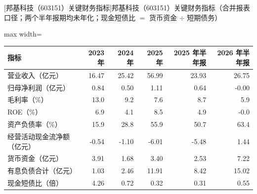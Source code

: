 \begin{center}\small\setlength{\tabcolsep}{3.4pt}
[邦基科技（603151）关键财务指标]{邦基科技（603151）关键财务指标（合并报表口径；两个半年报期均未年化；现金短债比 $=$ 货币资金 $\div$ 短期债务）}
\begin{adjustbox}{max width=\textwidth}
\begin{tabular}{@{}lrrrrr@{}}
\toprule
指标 & 2023 年 & 2024 年 & 2025 年 & 2025 年半年报 & 2026 年半年报 \\
\midrule
营业收入（亿元） & 16.47 & 25.42 & 56.99 & 23.93 & 26.75 \\
归母净利润（亿元） & 0.84 & 0.50 & 1.11 & 0.64 & -0.00 \\
毛利率（\%） & 13.0 & 9.2 & 7.6 & 8.7 & 5.9 \\
ROE（\%） & 6.9 & 4.1 & 8.5 & 4.9 & -0.0 \\
资产负债率（\%） & 15.9 & 28.8 & 55.9 & 50.7 & 63.4 \\
经营活动现金流净额（亿元） & -0.54 & -1.10 & -6.01 & -5.48 & 1.44 \\
货币资金（亿元） & 3.91 & 1.68 & 3.40 & 2.53 & 7.22 \\
有息负债合计（亿元） & 1.03 & 2.46 & 11.91 & 8.42 & 15.02 \\
现金短债比（倍） & 4.26 & 0.72 & 0.32 & 0.31 & 0.55 \\
\bottomrule
\end{tabular}
\end{adjustbox}
\end{center}

